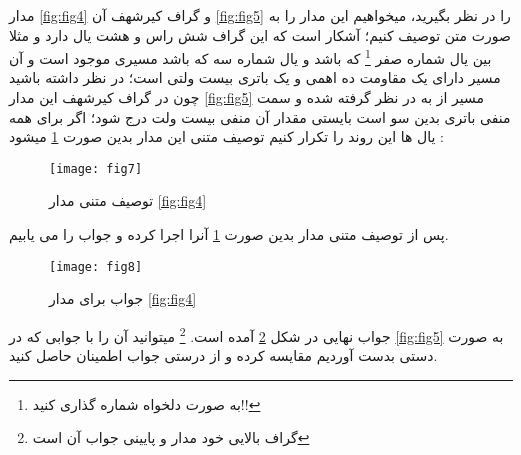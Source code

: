 مدار
\ref{fig:fig4}
و گراف کیرشهف آن
\ref{fig:fig5}
را در نظر بگیرید، میخواهیم این مدار را به صورت متن توصیف کنیم؛
آشکار است که این گراف شش راس و هشت یال دارد و مثلا بین یال شماره صفر
\footnote{
	به صورت دلخواه شماره گذاری کنید!!
}
که 
باشد
و یال شماره سه که
باشد مسیری موجود است و آن مسیر دارای یک مقاومت ده اهمی و یک باتری بیست ولتی است؛
در نظر داشته باشید چون در گراف کیرشهف این مدار
\ref{fig:fig5}
مسیر از
به
در نظر گرفته شده و سمت منفی باتری بدین سو است بایستی مقدار آن منفی بیست ولت درج شود؛
اگر برای همه یال ها این روند را تکرار کنیم توصیف متنی این مدار بدین صورت
\ref{fig:fig7}
میشود
:
\begin{figure}[ht]
	\centerline{\texttt{[image: fig7]}}
	\caption{توصیف متنی مدار
		\ref{fig:fig4}
	}
	\label{fig:fig7}
\end{figure}
پس از توصیف متنی مدار بدین صورت
\ref{fig:fig7}
آنرا اجرا کرده و جواب را می یابیم.
\begin{figure}[ht]
	\centerline{\texttt{[image: fig8]}}
	\caption{جواب
		برای مدار
		\ref{fig:fig4}
	}
	\label{fig:fig8}
	
\end{figure}
جواب نهایی در شکل 
\ref{fig:fig8}
آمده است.
\footnote{
	گراف بالایی خود مدار و پایینی جواب آن است
}
میتوانید آن را با جوابی که در
\ref{fig:fig5}
به صورت دستی بدست آوردیم مقایسه کرده و از درستی جواب اطمینان حاصل کنید.